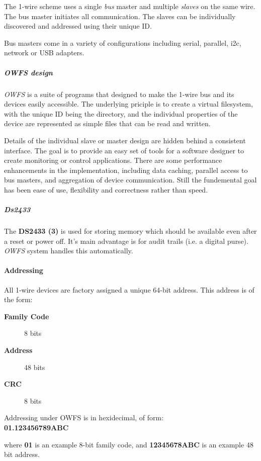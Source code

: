 The 1-wire scheme uses a single  \textit{bus} master
and multiple \textit{slaves} on the same wire. The bus master initiates all communication.
The slaves can be  individually discovered and addressed using their unique
ID. 

Bus masters come in a variety of configurations including serial, parallel,
i2c, network or USB adapters. 
\subparagraph*{OWFS design}\textit{OWFS} is a suite of programs that
designed to make the 1-wire bus and its devices easily accessible. The underlying
priciple is to create a virtual filesystem, with the unique ID being the
directory, and the individual properties of the device are represented
as simple files that can be read and written. 

Details of the individual
slave or master design are hidden behind a consistent interface. The goal
is to  provide an easy set of tools for a software designer to create monitoring
or control applications. There  are some performance enhancements in the
implementation, including data caching, parallel access to bus  masters,
and aggregation of device communication. Still the fundemental goal has
been ease of use, flexibility  and correctness rather than speed.  
\subparagraph*{Ds2433}The
\textsf{\textbf{DS2433 (3)}} is used for storing memory which should be available even after
a reset or power off. It's main advantage is for audit trails (i.e. a digital
purse). \textit{OWFS} system handles this automatically. 
\paragraph*{Addressing}
          All 1-wire
devices are factory assigned a unique 64-bit address. This address is of
the form: \begin{description}
\item [\textbf{Family Code} ] 8 bits 
\item [\textbf{Address} ] 48 bits 
\item [\textbf{CRC} ] 8 bits 
\end{description}


\begin{description}
\item [Addressing under
OWFS is in hexidecimal, of form: ] 
\item [\textbf{01.123456789ABC} ] 
\end{description}


where \textbf{01} is an example
8-bit family code, and \textbf{12345678ABC} is an example 48 bit address. 

